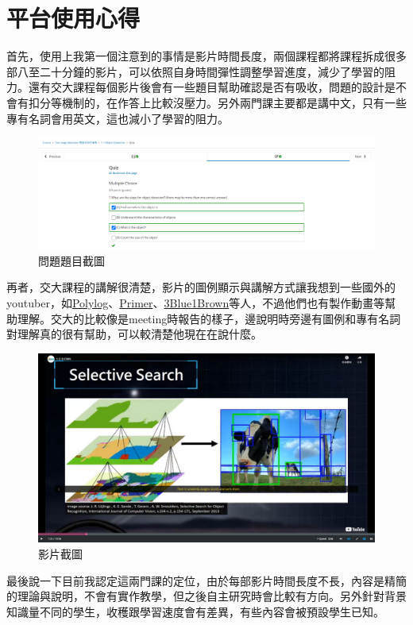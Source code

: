 \documentclass[12pt]{article}
\begin{document}
\section{平台使用心得}
\quad\quad
首先，使用上我第一個注意到的事情是影片時間長度，兩個課程都將課程拆成很多部八至二十分鐘的影片，可以依照自身時間彈性調整學習進度，減少了學習的阻力。還有交大課程每個影片後會有一些題目幫助確認是否有吸收，問題的設計是不會有扣分等機制的，在作答上比較沒壓力。另外兩門課主要都是講中文，只有一些專有名詞會用英文，這也減小了學習的阻力。
\begin{figure}[h]
    \centering
    \includegraphics[width=1\textwidth]{./assets/sc3.png}
    \caption{問題題目截圖}
    \label{fig:example}
\end{figure}

再者，交大課程的講解很清楚，影片的圖例顯示與講解方式讓我想到一些國外的youtuber，如\href{https://www.youtube.com/@PolylogCS}{Polylog}、\href{https://www.youtube.com/@PrimerBlobs}{Primer}、\href{https://www.youtube.com/@3blue1brown}{3Blue1Brown}等人，不過他們也有製作動畫等幫助理解。交大的比較像是meeting時報告的樣子，邊說明時旁邊有圖例和專有名詞對理解真的很有幫助，可以較清楚他現在在說什麼。
\begin{figure}[h]
    \centering
    \includegraphics[width=1\textwidth]{./assets/sc2.png}
    \caption{影片截圖}
    \label{fig:example}
\end{figure}

最後說一下目前我認定這兩門課的定位，由於每部影片時間長度不長，內容是精簡的理論與說明，不會有實作教學，但之後自主研究時會比較有方向。另外針對背景知識量不同的學生，收穫跟學習速度會有差異，有些內容會被預設學生已知。
\end{document}

